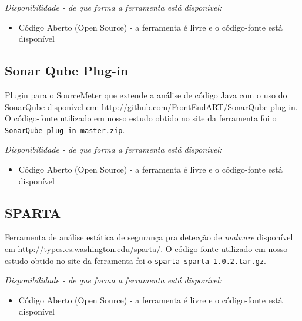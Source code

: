 \begin{description}

  \item {\it Disponibilidade - de que forma a ferramenta está disponível:}
    \begin{itemize}
      \item Código Aberto (Open Source) - a ferramenta é livre e o código-fonte está disponível
    \end{itemize}

\end{description}

\subsection{Sonar Qube Plug-in}

Plugin para o SourceMeter que extende a análise de
código Java com o uso do SonarQube disponível em:
\url{http://github.com/FrontEndART/SonarQube-plug-in}. O código-fonte
utilizado em nosso estudo obtido no site da ferramenta foi o
\texttt{SonarQube-plug-in-master.zip}.

\begin{description}

  \item {\it Disponibilidade - de que forma a ferramenta está disponível:}
    \begin{itemize}
      \item Código Aberto (Open Source) - a ferramenta é livre e o código-fonte está disponível
    \end{itemize}

\end{description}

\subsection{SPARTA}

Ferramenta de análise estática de segurança pra detecção de {\it
malware} disponível em
\url{http://types.cs.washington.edu/sparta/}. O código-fonte utilizado em nosso
estudo obtido no site da ferramenta foi o \texttt{sparta-sparta-1.0.2.tar.gz}.

\begin{description}

  \item {\it Disponibilidade - de que forma a ferramenta está disponível:}
    \begin{itemize}
      \item Código Aberto (Open Source) - a ferramenta é livre e o código-fonte está disponível
    \end{itemize}

\end{description}

